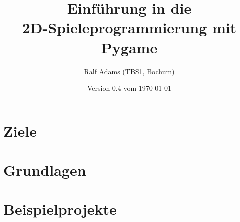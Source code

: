 \documentclass[a4paper,12pt,oneside]{scrreprt}
\begin{document}
  \title{Einführung in die\\2D-Spieleprogrammierung mit Pygame}
  \author{Ralf Adams (TBS1, Bochum)}
  \date{Version 0.4 vom \today}
  \maketitle
  \tableofcontents

\setlength{\parindent}{0.0em}
\setlength{\parskip}{1.0ex plus0.5ex minus0.5ex}
\setlength{\itemsep}{-0.3ex plus0.2ex}


\chapter{Ziele}
\chapter{Grundlagen}\label{secGrundlagen}













\chapter{Beispielprojekte}


\listoffigures
\lstlistoflistings

\printglossaries
\printindex
{}
\end{document}
